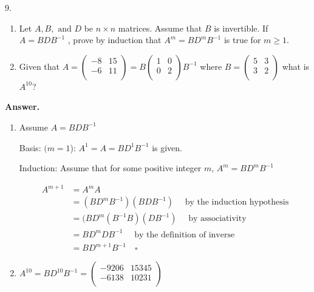 \documentclass[10pt,]{book}
\theoremstyle{plain}
\theoremstyle{definition}
\theoremstyle{definition}
\theoremstyle{definition}
\theoremstyle{definition}
\begin{document}
\begin{exercisegroup}
\item[9.]\hypertarget{exercise-16}{}\leavevmode%
\begin{enumerate}[label=\alph*]
\item\hypertarget{li-67}{} Let \(A, B, \textrm{ and } D\) be \(n\times n\) matrices. Assume that \(B\) is invertible. If \(A = B D B^{-1}\) , prove by induction
that \(A^m= B D^m B^{-1}\) is true for \(m \geq  1\).%
\item\hypertarget{li-68}{}Given that \(A = \left(
\begin{array}{cc}
 -8 & 15 \\
 -6 & 11 \\
\end{array}
\right) = B \left(
\begin{array}{cc}
 1 & 0 \\
 0 & 2 \\
\end{array}
\right) B^{-1}\) where \(B=\left(
\begin{array}{cc}
 5 & 3 \\
 3 & 2 \\
\end{array}
\right)\) what is \(A^{10}\)?%
\end{enumerate}
%
\par\smallskip
\par\smallskip
\noindent\textbf{Answer.}\hypertarget{answer-9}{}\quad
\leavevmode%
\begin{enumerate}[label=\alph*]
\item\hypertarget{li-69}{} Assume \(A=B D B^{-1}\)%
\par
Basis:  \((m=1\)): \(A^{1}=A=B D^1 B^{-1} \) is given.%
\par
Induction: Assume that for some positive integer \(m\), \(A^m=BD^mB^{-1}\)%
\par
\begin{equation*}
\begin{split}
A^{m+1} &=A^mA\\
 &=(B D^m B^{-1})(BDB^{-1})\quad \textrm{ by the induction hypothesis} \\
 &=(BD^m(B^{-1} B ) (DB^{-1}) \quad \textrm{ by associativity} \\
 &=B D^m  D B^{-1}  \quad \textrm{ by the definition of inverse}\\
 &=B D^{m+1} B^{-1} \quad \square
\end{split}
\end{equation*}
%
\item\hypertarget{li-70}{} \(A^{10}=BD^{10}B^{-1}= \left(
\begin{array}{cc}
 -9206 & 15345 \\
 -6138 & 10231 \\
\end{array}
\right)\)%
\end{enumerate}
%
\end{exercisegroup}
\par\smallskip\noindent
\typeout{************************************************}
\typeout{************************************************}
\end{document}
